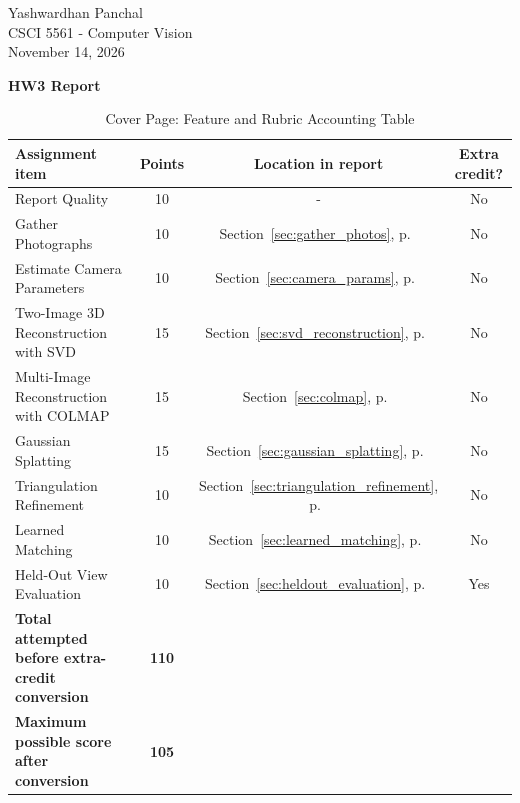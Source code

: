\documentclass[12pt]{article}
\begin{document}
\begin{flushleft}
\singlespacing
Yashwardhan Panchal\\
CSCI 5561 - Computer Vision\\
November 14, 2026\\[0.5em]
\begin{center}
\textbf{\Large HW3 Report}
\end{center}
\end{flushleft}

\begin{table}[H]
\centering
\singlespacing
\normalsize
\renewcommand{\arraystretch}{1.5}
\begin{tabularx}{\textwidth}{|X|c|c|c|}
\hline
\textbf{Assignment item} & \textbf{Points} & \textbf{Location in report} & \textbf{Extra credit?} \\
\hline
Report Quality & 10 & - & No \\
\hline
Gather Photographs & 10 & Section~\ref{sec:gather_photos}, p.~\pageref{sec:gather_photos} & No \\
\hline
Estimate Camera Parameters & 10 & Section~\ref{sec:camera_params}, p.~\pageref{sec:camera_params} & No \\
\hline
Two-Image 3D Reconstruction with SVD & 15 & Section~\ref{sec:svd_reconstruction}, p.~\pageref{sec:svd_reconstruction} & No \\
\hline
Multi-Image Reconstruction with COLMAP & 15 & Section~\ref{sec:colmap}, p.~\pageref{sec:colmap} & No \\
\hline
Gaussian Splatting & 15 & Section~\ref{sec:gaussian_splatting}, p.~\pageref{sec:gaussian_splatting} & No \\
\hline
Triangulation Refinement & 10 & Section~\ref{sec:triangulation_refinement}, p.~\pageref{sec:triangulation_refinement} & No \\
\hline
Learned Matching & 10 & Section~\ref{sec:learned_matching}, p.~\pageref{sec:learned_matching} & No \\
\hline
Held-Out View Evaluation & 10 & Section~\ref{sec:heldout_evaluation}, p.~\pageref{sec:heldout_evaluation} & Yes \\
\hline
\textbf{Total attempted before extra-credit conversion} & \textbf{110} & & \\
\hline
\textbf{Maximum possible score after conversion} & \textbf{105} & & \\
\hline
\end{tabularx}
\caption*{Cover Page: Feature and Rubric Accounting Table}
\end{table}
\end{document}
